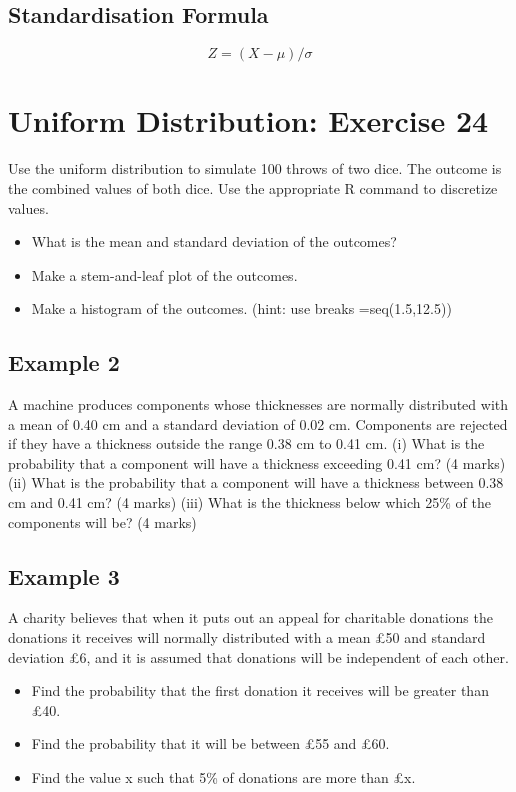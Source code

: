 \subsection{Standardisation Formula}

\begin{equation}
	Z = ( X - \mu ) / \sigma
\end{equation}

\section*{Uniform Distribution: Exercise 24}

Use the uniform distribution to simulate 100 throws of two dice. The outcome is the combined values of both dice. Use the appropriate R command to discretize values.
\begin{itemize}
	\item  What is the mean and standard deviation of the outcomes?
	\item  Make a stem-and-leaf plot of the outcomes.
	\item Make a histogram of the outcomes. (hint: use breaks =seq(1.5,12.5))
\end{itemize}



\subsection{Example 2}
A machine produces components whose thicknesses are normally
distributed with a mean of 0.40 cm and a standard deviation of 0.02 cm.
Components are rejected if they have a thickness outside the range 0.38 cm
to 0.41 cm.
(i) What is the probability that a component will have a thickness
exceeding 0.41 cm? (4 marks)
(ii) What is the probability that a component will have a thickness between
0.38 cm and 0.41 cm? (4 marks)
(iii) What is the thickness below which 25\% of the components will be? (4 marks)
\subsection{Example 3}
A charity believes that when it puts out an appeal for charitable donations the
donations it receives will normally distributed with a mean £50 and standard
deviation £6, and it is assumed that donations will be independent of each
other.
\begin{itemize}
	\item Find the probability that the first donation it receives will be greater
	than £40.
	\item Find the probability that it will be between £55 and £60.
	\item Find the value x such that 5\% of donations are more than £x.
\end{itemize}


